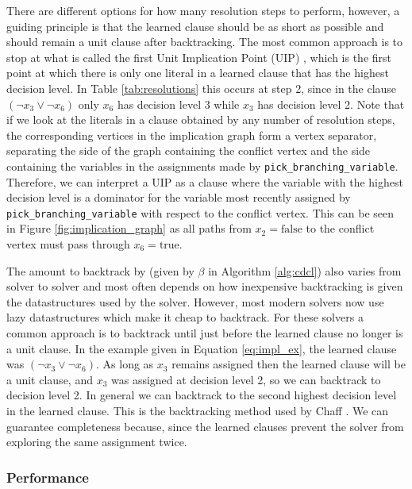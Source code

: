 
There are different options for how many resolution steps to perform, however, a guiding principle is that the learned clause
should be as short as possible and should remain a unit clause after backtracking.
The most common approach is to stop at what is called the first Unit Implication Point (UIP) \cite{biere2009conflict}, which is the first point
at which there is only one literal in a learned clause that has the highest decision level. In Table \ref{tab:resolutions}
this occurs at step 2, since in the clause $(\neg x_3 \lor \neg x_6)$ only $x_6$ has decision level 3 while $x_3$
has decision level 2.
Note that if we look at the literals in a clause obtained by any number of resolution steps, the corresponding vertices
in the implication graph form a vertex separator, separating the side of the graph containing the conflict vertex
and the side containing the variables in the assignments made by \texttt{pick\_branching\_variable}. 
Therefore, we can interpret a UIP as a clause where the variable with the highest decision level
is a dominator for the variable most recently assigned by \texttt{pick\_branching\_variable}
with respect to the conflict vertex. This can be seen in Figure \ref{fig:implication_graph} as all paths from $x_2 = \text{false}$
to the conflict vertex must pass through $x_6 = \text{true}$.

The amount to backtrack by (given by $\beta$ in Algorithm \ref{alg:cdcl}) also varies from solver to solver
and most often depends on how inexpensive backtracking is given the datastructures used by the solver.
However, most modern solvers now use lazy datastructures which make it cheap to backtrack. For these
solvers a common approach is to backtrack until just before the learned clause no longer is a unit clause.
In the example given in Equation \ref{eq:impl_ex}, the learned clause was $(\neg x_3 \lor \neg x_6)$. As long
as $x_3$ remains assigned then the learned clause will be a unit clause, and $x_3$ was assigned at decision level 2,
so we can backtrack to decision level 2. In general we can backtrack to the second highest decision level in the
learned clause. This is the backtracking method used by Chaff \cite{moskewicz2001chaff}.
We can guarantee completeness because, since the learned clauses prevent the solver from exploring
the same assignment twice.

\subsubsection{Performance}

